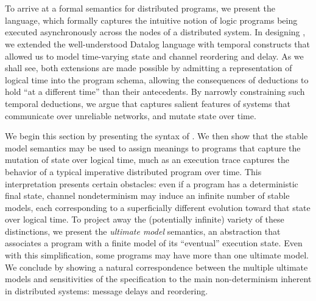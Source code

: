 \section{\large \bf \lang}
\label{sec:foundation}

To arrive at a formal semantics for distributed programs, we present the \lang~\cite{dedalus} language, which formally captures the intuitive notion of logic programs being executed asynchronously across the nodes of a distributed system.
In designing \lang, we extended the well-understood Datalog language with temporal constructs that allowed
us to model time-varying state and channel reordering and delay.  As we shall see, both extensions are made
possible by admitting a representation of logical time into the program schema, allowing the consequences of
deductions to hold ``at a different time'' than their antecedents.  By narrowly constraining such temporal 
deductions, we argue that \lang captures salient features of systems that communicate over unreliable networks, and mutate state over time.

We begin this section by presenting the syntax of \lang. We then show that the stable model semantics may be
used to assign meanings to \lang programs that capture the mutation of state over logical time, much as an execution trace  captures the behavior of a
typical imperative distributed program over time.  
This interpretation presents certain obstacles:
even if a \lang program has a deterministic final state, channel nondeterminism may induce an infinite number of stable models, each corresponding to a superficially different evolution toward that state over logical time.  To project away the (potentially infinite) variety of these distinctions, we present the {\em ultimate model} semantics, an abstraction that associates a program with a finite model of 
its ``eventual'' execution state.  Even with this simplification, some programs may have more than one ultimate model.  We conclude by showing a natural correspondence between the multiple ultimate models and sensitivities of the specification to the main non-determinism inherent in distributed systems: message delays and reordering.  



